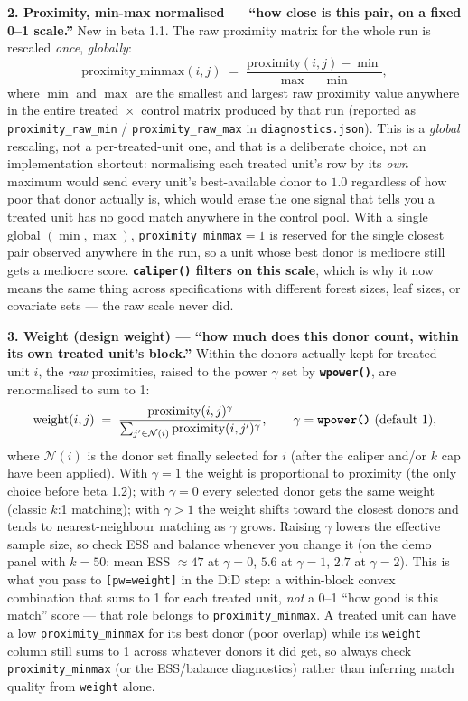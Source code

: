 \documentclass[11pt,a4paper]{article}
\newcommand{\opt}[1]{\texttt{\textbf{#1}}}
\newcommand{\code}[1]{\texttt{#1}}
\begin{document}
\medskip
\noindent\textbf{2. Proximity, min-max normalised --- ``how close is this pair, on a fixed
0--1 scale.''} New in beta 1.1. The raw proximity matrix for the whole run is rescaled
\emph{once}, \emph{globally}:
\[
\text{proximity\_minmax}(i,j) \;=\; \frac{\text{proximity}(i,j) - \min}{\max - \min},
\]
where $\min$ and $\max$ are the smallest and largest raw proximity value anywhere in the entire
treated~$\times$~control matrix produced by that run (reported as \code{proximity\_raw\_min} /
\code{proximity\_raw\_max} in \code{diagnostics.json}). This is a \emph{global} rescaling, not a
per-treated-unit one, and that is a deliberate choice, not an implementation shortcut:
normalising each treated unit's row by its \emph{own} maximum would send every unit's
best-available donor to $1.0$ regardless of how poor that donor actually is, which would erase
the one signal that tells you a treated unit has no good match anywhere in the control pool. With
a single global $(\min,\max)$, \code{proximity\_minmax}$=1$ is reserved for the single closest
pair observed anywhere in the run, so a unit whose best donor is mediocre still gets a mediocre
score. \textbf{\opt{caliper()} filters on this scale}, which is why it now means the same thing
across specifications with different forest sizes, leaf sizes, or covariate sets --- the raw
scale never did.

\medskip
\noindent\textbf{3. Weight (design weight) --- ``how much does this donor count, within its
own treated unit's block.''} Within the donors actually kept for treated unit $i$, the \emph{raw}
proximities, raised to the power $\gamma$ set by \opt{wpower()}, are renormalised to sum to 1:
\[
\text{weight}(i,j) \;=\; \frac{\text{proximity}(i,j)^{\gamma}}{\sum_{j' \in \mathcal{N}(i)} \text{proximity}(i,j')^{\gamma}},
\qquad \gamma=\text{\opt{wpower()}}\ (\text{default } 1),
\]
where $\mathcal{N}(i)$ is the donor set finally selected for $i$ (after the caliper and/or $k$
cap have been applied). With $\gamma=1$ the weight is proportional to proximity (the only
choice before beta 1.2); with $\gamma=0$ every selected donor gets the same weight (classic
$k$:1 matching); with $\gamma>1$ the weight shifts toward the closest donors and tends to
nearest-neighbour matching as $\gamma$ grows. Raising $\gamma$ lowers the effective sample size,
so check ESS and balance whenever you change it (on the demo panel with $k=50$: mean ESS
$\approx 47$ at $\gamma=0$, $5.6$ at $\gamma=1$, $2.7$ at $\gamma=2$). This is what you pass to \code{[pw=weight]} in the DiD step: a
within-block convex combination that sums to 1 for each treated unit, \emph{not} a 0--1
``how good is this match'' score --- that role belongs to \code{proximity\_minmax}. A treated
unit can have a low \code{proximity\_minmax} for its best donor (poor overlap) while its
\code{weight} column still sums to 1 across whatever donors it did get, so always check
\code{proximity\_minmax} (or the ESS/balance diagnostics) rather than inferring match quality
from \code{weight} alone.
\end{document}
